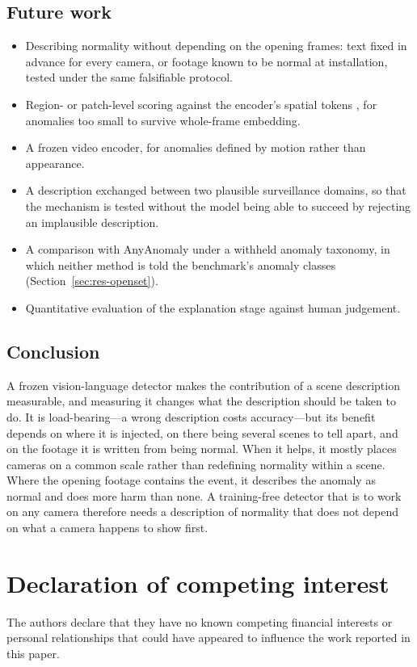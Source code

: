 \documentclass[a4paper,fleqn]{cas-sc}
\begin{document}
\subsection{Future work}
\begin{itemize}
  \item Describing normality without depending on the opening frames: text fixed in
        advance for every camera, or footage known to be normal at installation,
        tested under the same falsifiable protocol.
  \item Region- or patch-level scoring against the encoder's spatial tokens
        \citep{jeong2023winclip, zhou2024anomalyclip}, for anomalies too small to
        survive whole-frame embedding.
  \item A frozen video encoder, for anomalies defined by motion rather than
        appearance.
  \item A description exchanged between two plausible surveillance domains, so that
        the mechanism is tested without the model being able to succeed by rejecting
        an implausible description.
  \item A comparison with AnyAnomaly under a withheld anomaly taxonomy, in which
        neither method is told the benchmark's anomaly classes
        (Section~\ref{sec:res-openset}).
  \item Quantitative evaluation of the explanation stage against human judgement.
\end{itemize}

\subsection{Conclusion}
A frozen vision-language detector makes the contribution of a scene description
measurable, and measuring it changes what the description should be taken to do. It
is load-bearing---a wrong description costs accuracy---but its benefit depends on
where it is injected, on there being several scenes to tell apart, and on the
footage it is written from being normal. When it helps, it mostly places cameras on
a common scale rather than redefining normality within a scene. Where the opening
footage contains the event, it describes the anomaly as normal and does more harm
than none. A training-free detector that is to work on any camera therefore needs a
description of normality that does not depend on what a camera happens to show
first.

\section*{Declaration of competing interest}
The authors declare that they have no known competing financial interests or
personal relationships that could have appeared to influence the work reported in
this paper.
\end{document}
